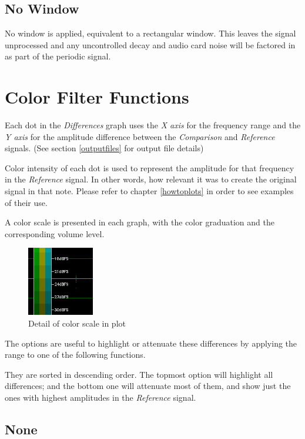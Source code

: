 \documentclass[10pt,a4paper]{report}
\begin{document}
\subsection{No Window}

No window is applied, equivalent to a rectangular window. This leaves the signal unprocessed and any uncontrolled decay and audio card noise will be factored in as part of the periodic signal.


\section{Color Filter Functions}
\label{colorfilter}

Each dot in the \textit{Differences} graph uses the \textit{X axis} for the frequency range and the \textit{Y axis} for the amplitude difference between the \textit{Comparison} and \textit{Reference} signals. (See section \ref{outputfiles} for output file details)

Color intensity of each dot is used to represent the amplitude for that frequency in the \textit{Reference} signal. In other words, how relevant it was to create the original signal in that note. Please refer to chapter \ref{howtoplots} in order to see examples of their use.

A color scale is presented in each graph, with the color graduation and the corresponding volume level.

\begin{figure}[H]
	\centering
	\includegraphics[width=0.2\linewidth]{plots/colorscale}
	\caption{Detail of color scale in plot}
	\label{fig:colorscale}
\end{figure}


The options are useful to highlight or attenuate these differences by applying the range to one of the following functions. 

They are sorted in descending order. The topmost option will highlight all differences; and the bottom one will attenuate most of them, and show just the ones with highest amplitudes in the \textit{Reference} signal.

\subsection{None} 
\end{document}

